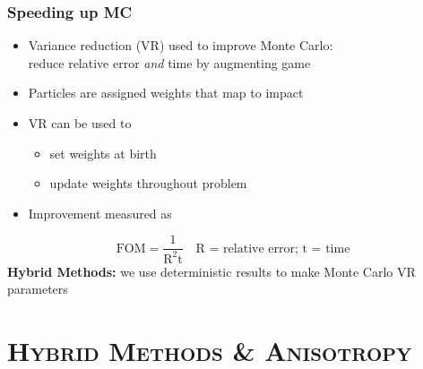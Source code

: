 \documentclass[xcolor=x11names,compress,handout]{beamer}
\renewcommand{\(}{\begin{columns}}
\renewcommand{\)}{\end{columns}}
\newcommand{\<}[1]{\begin{column}{#1}}
\renewcommand{\>}{\end{column}}
\begin{document}
\begin{frame}[fragile]
  \frametitle{Speeding up MC}
  \begin{itemize}
	\item Variance reduction (VR) used to improve Monte Carlo:\\
	reduce relative error \textit{and} time by augmenting game
	\item Particles are assigned weights that map to impact
	\item VR can be used to
	  \begin{itemize}
	  \item set weights at birth
	  \item update weights throughout problem
      \end{itemize}
      \pause
  \item Improvement measured as    
  \end{itemize}
\[
\text{FOM} = \frac{1}{\text{R}^2\text{t}} \quad \text{R = relative error;  t = time} 
\]
\pause
\textbf{Hybrid Methods:} we use deterministic results to make Monte Carlo VR parameters

\end{frame}


\section{\scshape Hybrid Methods \& Anisotropy}
\end{document}
